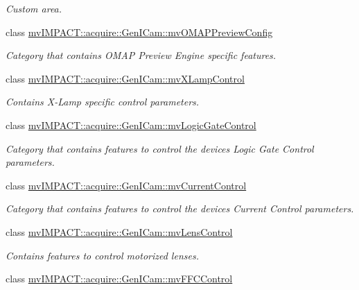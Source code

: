 \begin{DoxyCompactItemize}
\begin{DoxyCompactList}\small\item\em Custom area. \end{DoxyCompactList}\item 
class \hyperlink{classmv_i_m_p_a_c_t_1_1acquire_1_1_gen_i_cam_1_1mv_o_m_a_p_preview_config}{mv\+I\+M\+P\+A\+C\+T\+::acquire\+::\+Gen\+I\+Cam\+::mv\+O\+M\+A\+P\+Preview\+Config}
\begin{DoxyCompactList}\small\item\em Category that contains O\+M\+A\+P Preview Engine specific features. \end{DoxyCompactList}\item 
class \hyperlink{classmv_i_m_p_a_c_t_1_1acquire_1_1_gen_i_cam_1_1mv_x_lamp_control}{mv\+I\+M\+P\+A\+C\+T\+::acquire\+::\+Gen\+I\+Cam\+::mv\+X\+Lamp\+Control}
\begin{DoxyCompactList}\small\item\em Contains X-\/\+Lamp specific control parameters. \end{DoxyCompactList}\item 
class \hyperlink{classmv_i_m_p_a_c_t_1_1acquire_1_1_gen_i_cam_1_1mv_logic_gate_control}{mv\+I\+M\+P\+A\+C\+T\+::acquire\+::\+Gen\+I\+Cam\+::mv\+Logic\+Gate\+Control}
\begin{DoxyCompactList}\small\item\em Category that contains features to control the devices Logic Gate Control parameters. \end{DoxyCompactList}\item 
class \hyperlink{classmv_i_m_p_a_c_t_1_1acquire_1_1_gen_i_cam_1_1mv_current_control}{mv\+I\+M\+P\+A\+C\+T\+::acquire\+::\+Gen\+I\+Cam\+::mv\+Current\+Control}
\begin{DoxyCompactList}\small\item\em Category that contains features to control the devices Current Control parameters. \end{DoxyCompactList}\item 
class \hyperlink{classmv_i_m_p_a_c_t_1_1acquire_1_1_gen_i_cam_1_1mv_lens_control}{mv\+I\+M\+P\+A\+C\+T\+::acquire\+::\+Gen\+I\+Cam\+::mv\+Lens\+Control}
\begin{DoxyCompactList}\small\item\em Contains features to control motorized lenses. \end{DoxyCompactList}\item 
class \hyperlink{classmv_i_m_p_a_c_t_1_1acquire_1_1_gen_i_cam_1_1mv_f_f_c_control}{mv\+I\+M\+P\+A\+C\+T\+::acquire\+::\+Gen\+I\+Cam\+::mv\+F\+F\+C\+Control}

\end{DoxyCompactItemize}
